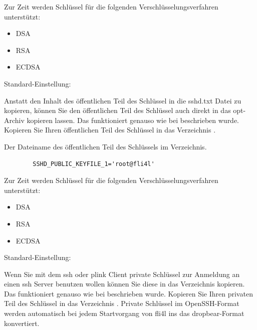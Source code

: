 \begin{description}
  Zur Zeit werden Schlüssel für die folgenden Verschlüsselungsverfahren
  unterstützt:
  \begin{itemize}
  \item DSA
  \item RSA
  \item ECDSA
  \end{itemize}


  Standard-Einstellung: 

  Anstatt den Inhalt des öffentlichen Teil des Schlüssel in die
  sshd.txt Datei zu kopieren, können Sie den öffentlichen Teil des
  Schlüssel auch direkt in das opt-Archiv kopieren lassen. Das
  funktioniert genauso wie bei  beschrieben
  wurde. Kopieren Sie Ihren öffentlichen Teil des Schlüssel in das
  Verzeichnis .


  Der Dateiname des öffentlichen Teil des Schlüssels im
   Verzeichnis.

\begin{example}
\begin{verbatim}
        SSHD_PUBLIC_KEYFILE_1='root@fli4l'
\end{verbatim}
\end{example}

  Zur Zeit werden Schlüssel für die folgenden Verschlüsselungsverfahren
  unterstützt:
  \begin{itemize}
  \item DSA
  \item RSA
  \item ECDSA
  \end{itemize}


  Standard-Einstellung: 

  Wenn Sie mit dem ssh oder plink Client private Schlüssel zur
  Anmeldung an einen ssh Server benutzen wollen können Sie diese in
  das Verzeichnis  kopieren. Das funktioniert genauso
  wie bei  beschrieben wurde. Kopieren Sie
  Ihren privaten Teil des Schlüssel in das Verzeichnis
  . Private Schlüssel im OpenSSH-Format
  werden automatisch bei jedem Startvorgang von fli4l ins das dropbear-Format
  konvertiert.
  

\end{description}
